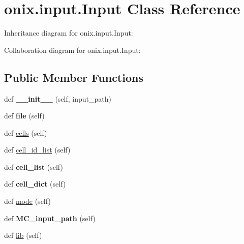 \hypertarget{classonix_1_1input_1_1Input}{}\section{onix.\+input.\+Input Class Reference}
\label{classonix_1_1input_1_1Input}


Inheritance diagram for onix.\+input.\+Input\+:


Collaboration diagram for onix.\+input.\+Input\+:
\subsection*{Public Member Functions}
\begin{DoxyCompactItemize}
\item 
\mbox{\label{classonix_1_1input_1_1Input_a8d6733968b6b9ed8e84df81778b87427}} 
def {\bfseries \+\_\+\+\_\+init\+\_\+\+\_\+} (self, input\+\_\+path)
\item 
\mbox{\label{classonix_1_1input_1_1Input_aff97f9a35c724823aaeb778174213067}} 
def {\bfseries file} (self)
\item 
def \hyperlink{classonix_1_1input_1_1Input_a57cfadd12e115631f7c692da7d6a9373}{cells} (self)
\item 
def \hyperlink{classonix_1_1input_1_1Input_a889fcf9e43cde20a4a00165166304028}{cell\+\_\+id\+\_\+list} (self)
\item 
\mbox{\label{classonix_1_1input_1_1Input_a0dc2dcc8a55376cb36656c56157d5355}} 
def {\bfseries cell\+\_\+list} (self)
\item 
\mbox{\label{classonix_1_1input_1_1Input_af0d6df809835653aba0ce0a9a88e22c4}} 
def {\bfseries cell\+\_\+dict} (self)
\item 
def \hyperlink{classonix_1_1input_1_1Input_a6060c4ee684525bc73d4fbc15287f96a}{mode} (self)
\item 
\mbox{\label{classonix_1_1input_1_1Input_ae9f1e0a7ef9ef71bcb8b65463a6fca45}} 
def {\bfseries M\+C\+\_\+input\+\_\+path} (self)
\item 
def \hyperlink{classonix_1_1input_1_1Input_aa9d1933ce8f2ec096ea158005527ad5b}{lib} (self)
\end{DoxyCompactItemize}
